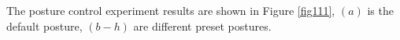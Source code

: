 \documentclass[conference]{IEEEtran}
\begin{document}
The posture control experiment results are shown in Figure \ref{fig111}, \((a)\) is the default posture, \((b-h)\) are different preset postures.

\begin{figure}
    \centering
     \\
     \\

\end{figure}
\end{document}
